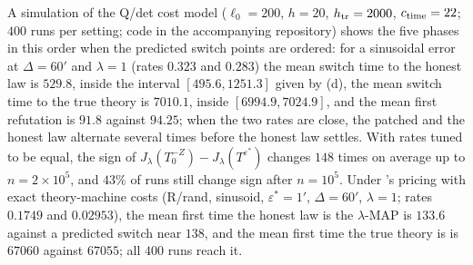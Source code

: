 A simulation of the Q/det cost model ($\ell_0=200$, $h=20$, $h_{\rm tr}=2000$, $c_{\rm time}=22$; $400$ runs per setting; code in the accompanying repository) shows the five phases in this order when the predicted switch points are ordered: for a sinusoidal error at $\Delta=60'$ and $\lambda=1$ (rates $0.323$ and $0.283$) the mean switch time to the honest law is $529.8$, inside the interval $[495.6,1251.3]$ given by (d), the mean switch time to the true theory is $7010.1$, inside $[6994.9,7024.9]$, and the mean first refutation is $91.8$ against $94.25$; when the two rates are close, the patched and the honest law alternate several times before the honest law settles. With rates tuned to be equal, the sign of $J_\lambda(T_0^{-Z})-J_\lambda(T^{\varepsilon^*})$ changes $148$ times on average up to $n=2\times10^5$, and $43\%$ of runs still change sign after $n=10^5$. Under \SAIabbr's pricing with exact theory-machine costs (R/rand, sinusoid, $\varepsilon^*=1'$, $\Delta=60'$, $\lambda=1$; rates $0.1749$ and $0.02953$), the mean first time the honest law is the $\lambda$-MAP is $133.6$ against a predicted switch near $138$, and the mean first time the true theory is is $67060$ against $67055$; all $400$ runs reach it.

